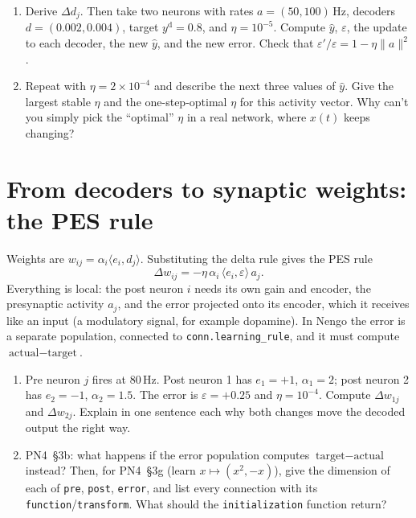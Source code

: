 \documentclass[11pt,letterpaper]{article}
\begin{document}
\begin{enumerate}
\item Derive $\Delta d_j$. Then take two neurons with rates $a = (50, 100)\,\mathrm{Hz}$, decoders $d = (0.002, 0.004)$, target $y^{\mathrm d} = 0.8$, and $\eta = 10^{-5}$. Compute $\hat y$, $\varepsilon$, the update to each decoder, the new $\hat y$, and the new error. Check that $\varepsilon'/\varepsilon = 1 - \eta\|a\|^2$.
\item Repeat with $\eta = 2\times10^{-4}$ and describe the next three values of $\hat y$. Give the largest stable $\eta$ and the one-step-optimal $\eta$ for this activity vector. Why can't you simply pick the ``optimal'' $\eta$ in a real network, where $x(t)$ keeps changing?
\end{enumerate}

\section{From decoders to synaptic weights: the PES rule}

\begin{idea}
Weights are $w_{ij} = \alpha_i\langle e_i, d_j\rangle$. Substituting the delta rule gives the PES rule
\[
\Delta w_{ij} = -\eta\,\alpha_i\,\langle e_i, \varepsilon\rangle\,a_j .
\]
Everything is local: the post neuron $i$ needs its own gain and encoder, the presynaptic activity $a_j$, and the error projected onto its encoder, which it receives like an input (a modulatory signal, for example dopamine). In Nengo the error is a separate population, connected to \texttt{conn.learning\_rule}, and it must compute $\text{actual} - \text{target}$.
\end{idea}

\begin{enumerate}
\item Pre neuron $j$ fires at $80\,\mathrm{Hz}$. Post neuron 1 has $e_1 = +1$, $\alpha_1 = 2$; post neuron 2 has $e_2 = -1$, $\alpha_2 = 1.5$. The error is $\varepsilon = +0.25$ and $\eta = 10^{-4}$. Compute $\Delta w_{1j}$ and $\Delta w_{2j}$. Explain in one sentence each why both changes move the decoded output the right way.
\item PN4~\S3b: what happens if the error population computes $\text{target} - \text{actual}$ instead? Then, for PN4~\S3g (learn $x \mapsto (x^2, -x)$), give the dimension of each of \texttt{pre}, \texttt{post}, \texttt{error}, and list every connection with its \texttt{function}/\texttt{transform}. What should the \texttt{initialization} function return?
\end{enumerate}
\end{document}
